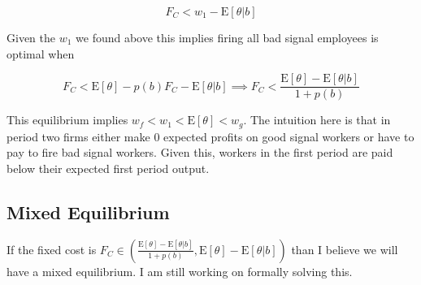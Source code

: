 \documentclass[11pt]{article}
\newcommand{\E}{\mathrm{E}}
\begin{document}
$$ F_C <  w_1 - \E[\theta|b] $$

Given the $w_1$ we found above this implies firing all bad signal employees is optimal when 

$$F_C <\E[\theta] - p(b) F_C - \E[\theta |b] \implies F_C < \frac{\E[\theta] - \E[\theta|b]}{1+p(b)}$$

This equilibrium implies $w_f < w_1 < \E[\theta] < w_g$. The intuition here is that in period two firms either make 0 expected profits on good signal workers or have to pay to fire bad signal workers. Given this, workers in the first period are paid below their expected first period output. 
 
\subsection{Mixed Equilibrium}

If the fixed cost is $F_C \in \left( \frac{\E[\theta] - \E[\theta|b]}{1+p(b)}, \E[\theta] - \E[\theta |b] \right)$ than I believe we will have a mixed equilibrium. I am still working on formally solving this. 


	
\end{document}
